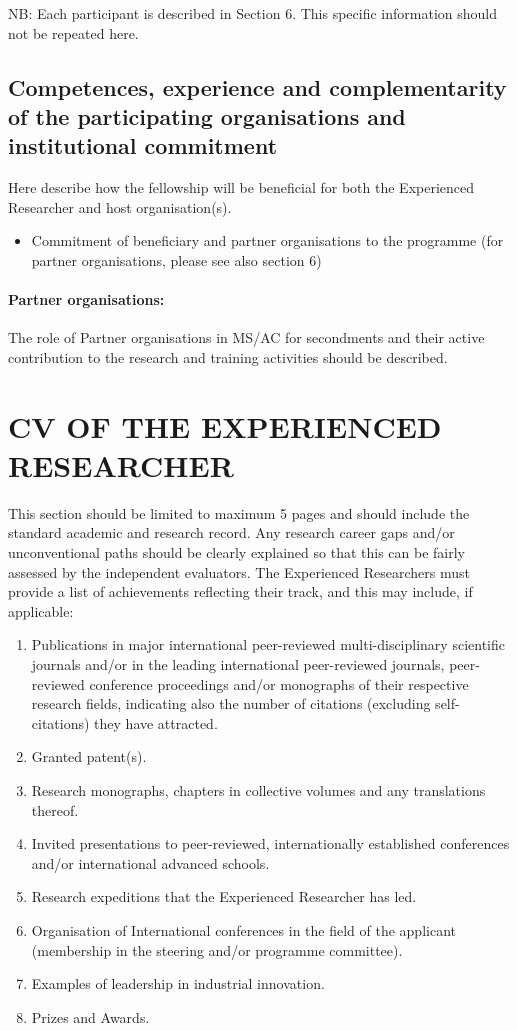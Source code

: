 \documentclass[a4paper,11pt]{article}
\begin{document}
NB: Each participant is described in Section 6. This specific information should not be repeated here. 

\subsection{Competences, experience and complementarity of the participating organisations and institutional commitment}
\label{sec:competences}

Here describe how the fellowship will be beneficial for both the Experienced Researcher and host organisation(s).
\begin{itemize}
\item Commitment of beneficiary and partner organisations to the programme (for partner organisations, please see also section 6)
\end{itemize}

\paragraph{Partner organisations:}
The role of Partner organisations in MS/AC for secondments and their active contribution to the research and training activities should be described. 


\newpage
\section{CV OF THE EXPERIENCED RESEARCHER}
\label{sec:cv}

This section should be limited to maximum 5 pages and should include the standard academic and research record. Any research career gaps and/or unconventional paths should be clearly explained so that this can be fairly assessed by the independent evaluators.
The Experienced Researchers must provide a list of achievements reflecting their track, and this may include, if applicable:

\begin{enumerate}
\item Publications in major international peer-reviewed multi-disciplinary scientific journals and/or in the leading international peer-reviewed journals, peer-reviewed conference proceedings and/or monographs of their respective research fields, indicating also the number of citations (excluding self-citations) they have attracted.
\item Granted patent(s).
\item Research monographs, chapters in collective volumes and any translations thereof.
\item Invited presentations to peer-reviewed, internationally established conferences and/or international advanced schools.
\item Research expeditions that the Experienced Researcher has led. 
\item Organisation of International conferences in the field of the applicant (membership in the steering and/or programme committee).
\item Examples of leadership in industrial innovation.
\item Prizes and Awards.
\end{enumerate}
\end{document}
